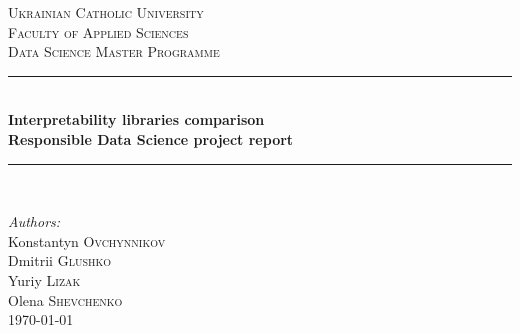 \begin{titlepage}

\newcommand{\HRule}{\rule{\linewidth}{0.5mm}} %

\center %
 
\vspace*{0.5cm}
\textsc{\LARGE Ukrainian Catholic University}\\[1cm] %
\textsc{\Large  Faculty of Applied Sciences}\\[0.5cm] %
\textsc{\large Data Science Master Programme}\\[0.5cm] %

\vspace*{1.5cm}

\HRule \\[0.4cm]
{ \huge \bfseries Interpretability libraries comparison}\\[10pt]
{\Large \bfseries Responsible Data Science project report}\\[0.4cm] %
\HRule \\[1cm]
 
\vspace*{2.5cm}

\Large \emph{Authors:}\\
Konstantyn  \textsc{Ovchynnikov}\\
Dmitrii \textsc{Glushko}\\
Yuriy \textsc{Lizak}\\
Olena \textsc{Shevchenko}\\[1cm] %

\vspace*{0.5cm}
{\large \today}\\[0.5cm] %


\end{titlepage}
